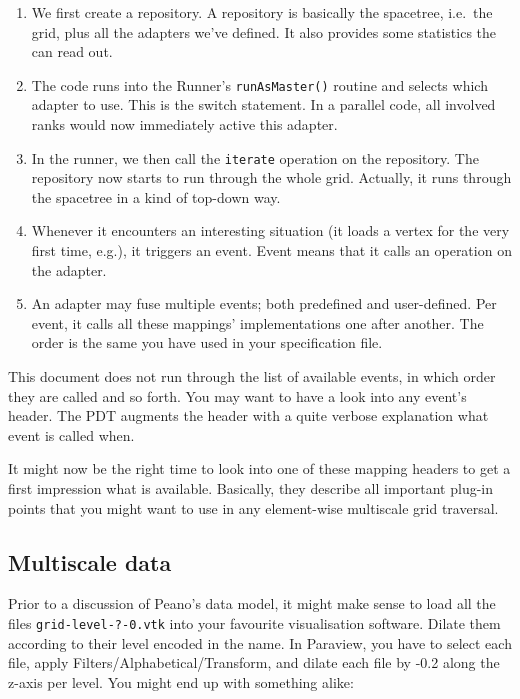 \begin{enumerate}
  \item We first create a repository. A repository is basically the spacetree,
  i.e.~the grid, plus all the adapters we've defined. It also provides some
  statistics the can read out.
  \item The code runs into the Runner's \texttt{runAsMaster()} routine and
  selects which adapter to use. This is the switch statement. In a parallel
  code, all involved ranks would now immediately active this adapter.
  \item In the runner, we then call the \texttt{iterate} operation on the
  repository. The repository now starts to run through the whole grid. Actually,
  it runs through the spacetree in a kind of top-down way.
  \item Whenever it encounters an interesting situation (it loads a vertex for
  the very first time, e.g.), it triggers an event. Event means that it calls an
  operation on the adapter.
  \item An adapter may fuse multiple events; both predefined and user-defined.
  Per event, it calls all these mappings' implementations one after another. The
  order is the same you have used in your specification file.
\end{enumerate}

\begin{remark}
  This document does not run through the list of available events, in which
  order they are called and so forth. You may want to have a look into any
  event's header. The PDT augments the header with a quite verbose explanation
  what event is called when.
\end{remark}

It might now be the right time to look into one of these mapping headers to get
a first impression what is available.
Basically, they describe all important plug-in points that you might want to use
in any element-wise multiscale grid traversal.

% 



\subsection{Multiscale data}
Prior to a discussion of Peano's data model, it might make sense to load all the
files \texttt{grid-level-?-0.vtk} into your favourite visualisation software.
Dilate them according to their level encoded in the name.
In Paraview, you have to select each file, apply
Filters/Alphabetical/Transform, and dilate each file by -0.2 along the z-axis
per level.
You might end up with something alike:



